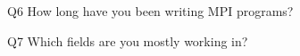 \begin{description}%
\item{Q6} How long have you been writing MPI programs?%
\item{Q7} Which fields are you mostly working in?%
\end{description}%
